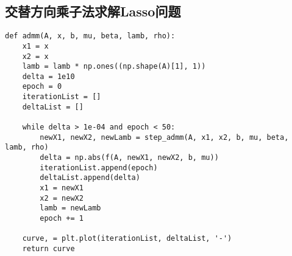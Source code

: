 \subsection{交替方向乘子法求解Lasso问题}
\begin{lstlisting}
def admm(A, x, b, mu, beta, lamb, rho):
    x1 = x
    x2 = x
    lamb = lamb * np.ones((np.shape(A)[1], 1))
    delta = 1e10
    epoch = 0
    iterationList = []
    deltaList = []

    while delta > 1e-04 and epoch < 50:
        newX1, newX2, newLamb = step_admm(A, x1, x2, b, mu, beta, lamb, rho)
        delta = np.abs(f(A, newX1, newX2, b, mu))
        iterationList.append(epoch)
        deltaList.append(delta)
        x1 = newX1
        x2 = newX2
        lamb = newLamb
        epoch += 1

    curve, = plt.plot(iterationList, deltaList, '-')
    return curve
\end{lstlisting}